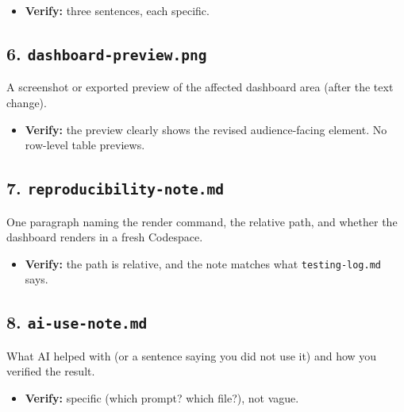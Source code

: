 \documentclass[
  letterpaper,
  DIV=11,
  numbers=noendperiod,
  oneside]{scrreprt}
\providecommand{\tightlist}{%
  \setlength{\itemsep}{0pt}\setlength{\parskip}{0pt}}
\begin{document}
\begin{itemize}
\tightlist
\item
  \textbf{Verify:} three sentences, each specific.
\end{itemize}

\subsection*{\texorpdfstring{6.
\texttt{dashboard-preview.png}}{6. dashboard-preview.png}}\label{dashboard-preview.png}

A screenshot or exported preview of the affected dashboard area (after
the text change).

\begin{itemize}
\tightlist
\item
  \textbf{Verify:} the preview clearly shows the revised audience-facing
  element. No row-level table previews.
\end{itemize}

\subsection*{\texorpdfstring{7.
\texttt{reproducibility-note.md}}{7. reproducibility-note.md}}\label{reproducibility-note.md}

One paragraph naming the render command, the relative path, and whether
the dashboard renders in a fresh Codespace.

\begin{itemize}
\tightlist
\item
  \textbf{Verify:} the path is relative, and the note matches what
  \texttt{testing-log.md} says.
\end{itemize}

\subsection*{\texorpdfstring{8.
\texttt{ai-use-note.md}}{8. ai-use-note.md}}\label{ai-use-note.md-2}

What AI helped with (or a sentence saying you did not use it) and how
you verified the result.

\begin{itemize}
\tightlist
\item
  \textbf{Verify:} specific (which prompt? which file?), not vague.
\end{itemize}
\end{document}
